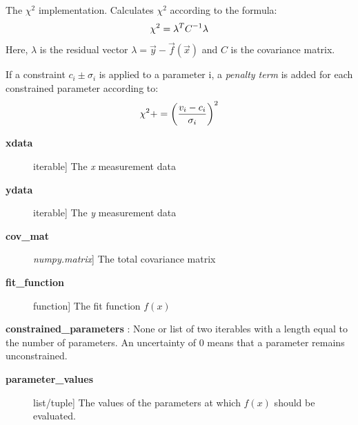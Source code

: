 \documentclass[a4paper,10pt,english]{sphinxmanual}
\begin{document}

\begin{fulllineitems}
\label{index:kafe.fit.chi2}
The $\chi^2$ implementation. Calculates $\chi^2$ according
to the formula:
\begin{gather}
\begin{split}\chi^2 = \lambda^T C^{-1} \lambda\end{split}\notag
\end{gather}
Here, $\lambda$ is the residual vector $\lambda = \vec{y} -
\vec{f}(\vec{x})$ and $C$ is the covariance matrix.

If a constraint $c_i\pm\sigma_i$ is applied to  a parameter i,
a \emph{penalty term} is added for each constrained parameter according to:
\begin{gather}
\begin{split}\chi^2 += \left( \frac{v_i - c_i}{\sigma_i} \right)^2\end{split}\notag
\end{gather}\begin{description}
\item[{\textbf{xdata}}] \leavevmode{[}iterable{]}
The \emph{x} measurement data

\item[{\textbf{ydata}}] \leavevmode{[}iterable{]}
The \emph{y} measurement data

\item[{\textbf{cov\_mat}}] \leavevmode{[}\emph{numpy.matrix}{]}
The total covariance matrix

\item[{\textbf{fit\_function}}] \leavevmode{[}function{]}
The fit function $f(x)$

\end{description}

\textbf{constrained\_parameters} : None or list of two iterables
with a length equal to the number of parameters. An uncertainty of
0 means that a parameter remains unconstrained.
\begin{description}
\item[{\textbf{parameter\_values}}] \leavevmode{[}list/tuple{]}
The values of the parameters at which $f(x)$ should be evaluated.

\end{description}

\end{fulllineitems}
\end{document}
